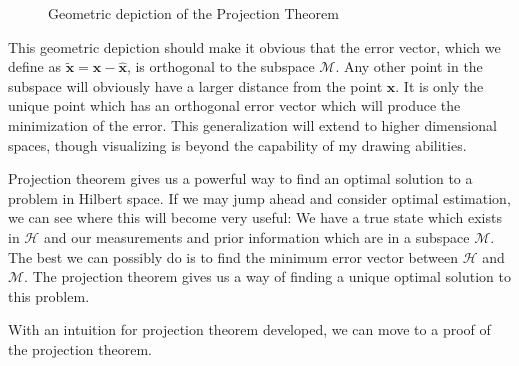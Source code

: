 \begin{figure}[ht]

   
    \caption{Geometric depiction of the Projection Theorem}
    \label{fig:proj thm geometric}
\end{figure}

This geometric depiction should make it obvious that the error vector, which we define as $\bm{\tilde{x}}=\bm{x}-\bm{\hat{x}}$, is orthogonal to the subspace $\mathcal{M}$. Any other point in the subspace will obviously have a larger distance from the point $\bm{x}$. It is only the unique point which has an orthogonal error vector which will produce the minimization of the error. This generalization will extend to higher dimensional spaces, though visualizing is beyond the capability of my drawing abilities.

Projection theorem gives us a powerful way to find an optimal solution to a problem in Hilbert space. If we may jump ahead and consider optimal estimation, we can see where this will become very useful: We have a true state which exists in $\mathcal{H}$ and our measurements and prior information which are in a subspace $\mathcal{M}$. The best we can possibly do is to find the minimum error vector between $\mathcal{H}$ and $\mathcal{M}$. The projection theorem gives us a way of finding a unique optimal solution to this problem.

With an intuition for projection theorem developed, we can move to a proof of the projection theorem.

